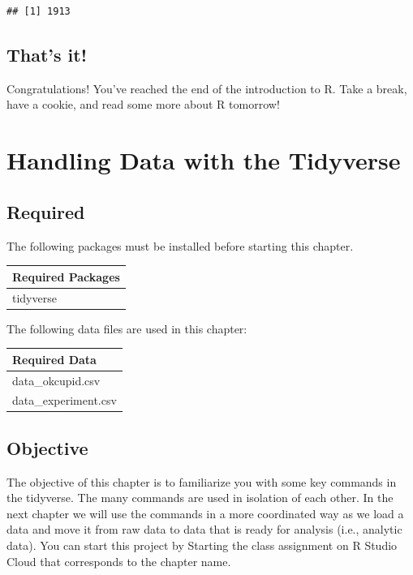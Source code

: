 \documentclass[
]{krantz}
\begin{document}
\begin{verbatim}
## [1] 1913
\end{verbatim}

\hypertarget{thats-it}{%
\section{That's it!}\label{thats-it}}

Congratulations! You've reached the end of the introduction to R. Take a break, have a cookie, and read some more about R tomorrow!

\hypertarget{handling-data-with-the-tidyverse}{%
\chapter{Handling Data with the Tidyverse}\label{handling-data-with-the-tidyverse}}

\hypertarget{required}{%
\section{Required}\label{required}}

The following packages must be installed before starting this chapter.

\begin{longtable}[]{@{}l@{}}
\toprule
Required Packages\tabularnewline
\midrule
\endhead
tidyverse\tabularnewline
\bottomrule
\end{longtable}

The following data files are used in this chapter:

\begin{longtable}[]{@{}l@{}}
\toprule
Required Data\tabularnewline
\midrule
\endhead
data\_okcupid.csv\tabularnewline
data\_experiment.csv\tabularnewline
\bottomrule
\end{longtable}

\hypertarget{objective}{%
\section{Objective}\label{objective}}

The objective of this chapter is to familiarize you with some key commands in the tidyverse. The many commands are used in isolation of each other. In the next chapter we will use the commands in a more coordinated way as we load a data and move it from raw data to data that is ready for analysis (i.e., analytic data). You can start this project by Starting the class assignment on R Studio Cloud that corresponds to the chapter name.
\end{document}
